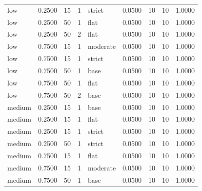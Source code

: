 \begin{tabular}{lrrrlrrrr}
low & 0.2500 & 15 & 1 & strict & 0.0500 & 10 & 10 & 1.0000 \\
low & 0.2500 & 50 & 1 & flat & 0.0500 & 10 & 10 & 1.0000 \\
low & 0.2500 & 50 & 2 & flat & 0.0500 & 10 & 10 & 1.0000 \\
low & 0.7500 & 15 & 1 & moderate & 0.0500 & 10 & 10 & 1.0000 \\
low & 0.7500 & 15 & 1 & strict & 0.0500 & 10 & 10 & 1.0000 \\
low & 0.7500 & 50 & 1 & base & 0.0500 & 10 & 10 & 1.0000 \\
low & 0.7500 & 50 & 1 & flat & 0.0500 & 10 & 10 & 1.0000 \\
low & 0.7500 & 50 & 2 & base & 0.0500 & 10 & 10 & 1.0000 \\
medium & 0.2500 & 15 & 1 & base & 0.0500 & 10 & 10 & 1.0000 \\
medium & 0.2500 & 15 & 1 & flat & 0.0500 & 10 & 10 & 1.0000 \\
medium & 0.2500 & 15 & 1 & strict & 0.0500 & 10 & 10 & 1.0000 \\
medium & 0.2500 & 50 & 1 & strict & 0.0500 & 10 & 10 & 1.0000 \\
medium & 0.7500 & 15 & 1 & flat & 0.0500 & 10 & 10 & 1.0000 \\
medium & 0.7500 & 15 & 1 & moderate & 0.0500 & 10 & 10 & 1.0000 \\
medium & 0.7500 & 50 & 1 & base & 0.0500 & 10 & 10 & 1.0000 \\
\bottomrule
\end{tabular}
